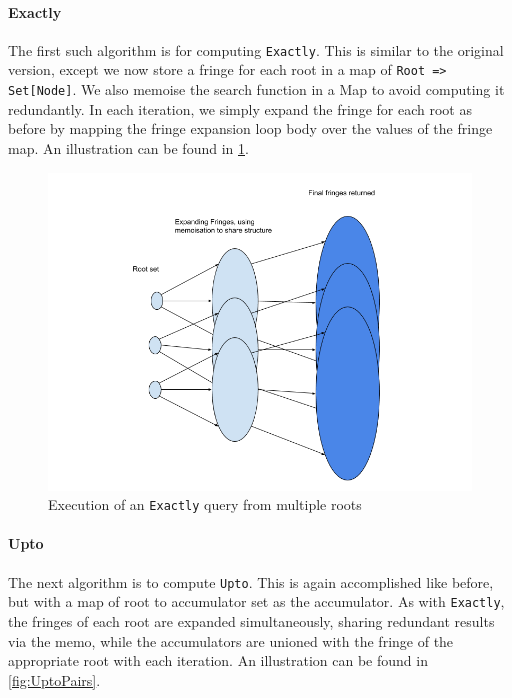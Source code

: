\documentclass[12pt,a4paper,twoside,openright]{report}
\newcommand\codeName[1]{\texttt{#1}}
\let\oldparagraph\paragraph
\renewcommand{\paragraph}[1]{\oldparagraph{#1}\mbox{}}
\begin{document}
		\paragraph{Exactly}
The first such algorithm is for computing \codeName{Exactly}. This is similar to the original version, except we now store a fringe for each root in a map of \codeName{Root => Set[Node]}. We also memoise the search function in a Map to avoid computing it redundantly. In each iteration, we simply expand the fringe for each root as before by mapping the fringe expansion loop body over the values of the fringe map. An illustration can be found in \ref{fig:ExactlyPairs}.

\begin{figure}[ht]
\centering
  \includegraphics[width=\textwidth]{figs/ExactlyPairs.png}
  \caption{Execution of an \codeName{Exactly} query from multiple roots}
  \label{fig:ExactlyPairs}
\end{figure}
		
		\paragraph{Upto}
The next algorithm is to compute \codeName{Upto}. This is again accomplished like before, but with a map of root to accumulator set as the accumulator. As with \codeName{Exactly}, the fringes of each root are expanded simultaneously, sharing redundant results via the memo, while the accumulators are unioned with the fringe of the appropriate root with each iteration. An illustration can be found in \ref{fig:UptoPairs}.
\end{document}
